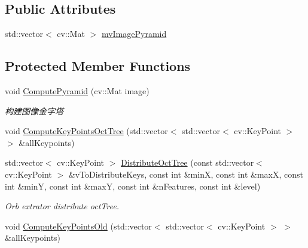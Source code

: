 \subsection*{Public Attributes}
\begin{DoxyCompactItemize}
\item 
std\+::vector$<$ cv\+::\+Mat $>$ \mbox{\hyperlink{class_o_r_b___s_l_a_m2_1_1_o_r_bextractor_a57f88e0959582dde9ae5bdee1fe3de65}{mv\+Image\+Pyramid}}
\end{DoxyCompactItemize}
\subsection*{Protected Member Functions}
\begin{DoxyCompactItemize}
\item 
void \mbox{\hyperlink{class_o_r_b___s_l_a_m2_1_1_o_r_bextractor_a058f24d80bb0b2c7d6fc0bdd3d9144d1}{Compute\+Pyramid}} (cv\+::\+Mat image)
\begin{DoxyCompactList}\small\item\em 构建图像金字塔 \end{DoxyCompactList}\item 
void \mbox{\hyperlink{class_o_r_b___s_l_a_m2_1_1_o_r_bextractor_a9a543d9b2aec1e521058ee9522937adc}{Compute\+Key\+Points\+Oct\+Tree}} (std\+::vector$<$ std\+::vector$<$ cv\+::\+Key\+Point $>$ $>$ \&all\+Keypoints)
\item 
std\+::vector$<$ cv\+::\+Key\+Point $>$ \mbox{\hyperlink{class_o_r_b___s_l_a_m2_1_1_o_r_bextractor_ac6b7b27447324af33fa60d6dc0c8ffa0}{Distribute\+Oct\+Tree}} (const std\+::vector$<$ cv\+::\+Key\+Point $>$ \&v\+To\+Distribute\+Keys, const int \&minX, const int \&maxX, const int \&minY, const int \&maxY, const int \&n\+Features, const int \&level)
\begin{DoxyCompactList}\small\item\em Orb extrator distribute oct\+Tree. \end{DoxyCompactList}\item 
void \mbox{\hyperlink{class_o_r_b___s_l_a_m2_1_1_o_r_bextractor_a56890a2032077fbfdf48687786985548}{Compute\+Key\+Points\+Old}} (std\+::vector$<$ std\+::vector$<$ cv\+::\+Key\+Point $>$ $>$ \&all\+Keypoints)
\end{DoxyCompactItemize}
